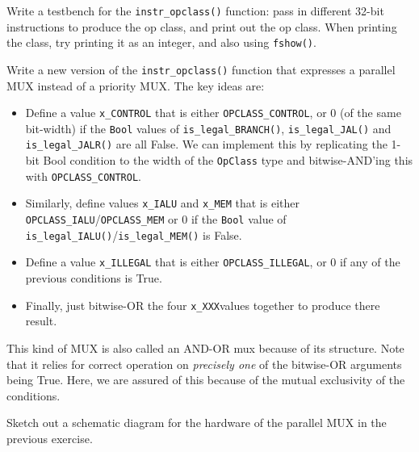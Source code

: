 
\hdivider

\Exercise

Write a testbench for the \verb|instr_opclass()| function: pass in
different 32-bit instructions to produce the op class, and print out
the op class.  When printing the class, try printing it as an integer,
and also using \verb|fshow()|.

\Exercise

Write a new version of the \verb|instr_opclass()| function that
expresses a parallel MUX instead of a priority MUX.  The key ideas
are:

  \begin{itemize}

    \item Define a value \verb|x_CONTROL| that is either
      \verb|OPCLASS_CONTROL|, or 0 (of the same bit-width) if the
      \verb|Bool| values of \verb|is_legal_BRANCH()|,
      \verb|is_legal_JAL()| and \verb|is_legal_JALR()| are all False.
      We can implement this by replicating the 1-bit Bool condition to
      the width of the \verb|OpClass| type and bitwise-AND'ing this
      with \verb|OPCLASS_CONTROL|.

    \item Similarly, define values \verb|x_IALU| and \verb|x_MEM| that
       is either \verb|OPCLASS_IALU|/\verb|OPCLASS_MEM| or 0 if the
       \verb|Bool| value of
       \verb|is_legal_IALU()|/\verb|is_legal_MEM()| is False.

    \item Define a value \verb|x_ILLEGAL| that is either
      \verb|OPCLASS_ILLEGAL|, or 0 if any of
      the previous conditions is True.

    \item Finally, just bitwise-OR the four \verb|x_XXX|values
      together to produce there result.

  \end{itemize}

  This kind of MUX is also called an AND-OR mux because of its
  structure.  Note that it relies for correct operation on
  \emph{precisely one} of the bitwise-OR arguments being True.  Here,
  we are assured of this because of the mutual exclusivity of the
  conditions.

\Exercise

Sketch out a schematic diagram for the hardware of the parallel MUX in
the previous exercise.

